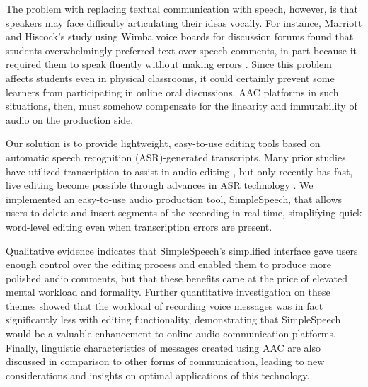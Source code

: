 The problem with replacing textual communication with speech, however, is that speakers may face difficulty articulating their ideas vocally.
For instance, Marriott and Hiscock's study using Wimba voice boards for discussion forums found that students overwhelmingly preferred text over speech comments, in part because it required them to speak fluently without making errors \cite{wimba}.
Since this problem affects students even in physical classrooms, it could certainly prevent some learners from participating in online oral discussions.
AAC platforms in such situations, then, must somehow compensate for the linearity and immutability of audio on the production side.

Our solution is to provide lightweight, easy-to-use editing tools based on automatic speech recognition (ASR)-generated transcripts.
Many prior studies have utilized transcription to assist in audio editing \cite{casares,rubin,whittaker_semantic}, but only recently has fast, live editing become possible through advances in ASR technology \cite{baker,saon}.
We implemented an easy-to-use audio production tool, SimpleSpeech, that allows users to delete and insert segments of the recording in real-time, simplifying quick word-level editing even when transcription errors are present.

Qualitative evidence indicates that SimpleSpeech's simplified interface gave users enough control over the editing process and enabled them to produce more polished audio comments, but that these benefits came at the price of elevated mental workload and formality.
Further quantitative investigation on these themes showed that the workload of recording voice messages was in fact significantly less with editing functionality, demonstrating that SimpleSpeech would be a valuable enhancement to online audio communication platforms.
Finally, linguistic characteristics of messages created using AAC are also discussed in comparison to other forms of communication, leading to new considerations and insights on optimal applications of this technology.
